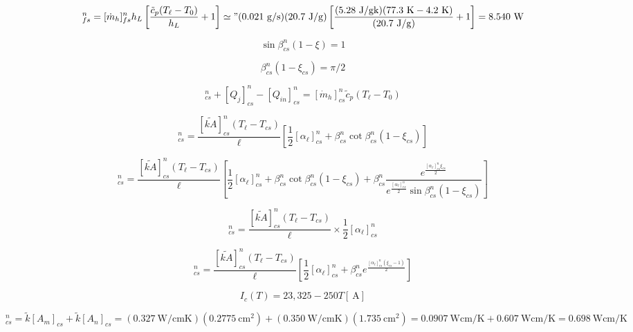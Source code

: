 \begin{equation}
[Q_\ell]_{fs}^{n}=[\dot{m}_h]_{fs}^{n}h_L\left[\frac{\tilde{c}_p(T_\ell-T_0)}{h_L}+1\right] 
\simeq"(0.021\ \mathrm{g/s})(20.7\ \mathrm{J/g})\left[\frac{(5.28\ \mathrm{J/gk})(77.3\ \mathrm{K}-4.2\ \mathrm{K})}{(20.7\ \mathrm{J/g})}+1\right]=8.540\ \mathrm{W}
\end{equation}

\begin{equation}%
\sin\beta_{cs}^{n}(1-\xi)=1
\end{equation}

\begin{equation}%
\beta_{cs}^{n}(1-\xi_{cs})=\pi/2
\end{equation}

\begin{equation}%
[Q_\ell]_{cs}^{n}+[Q_j]_{cs}^{n}-[Q_{in}]_{cs}^{n}=[\dot{m}_h]_{cs}^{n}\tilde{c}_p(T_\ell-T_0)
\end{equation}

\begin{equation}%
[Q_\ell]_{cs}^{n}=\frac{[\tilde{kA}]_{cs}^{n}(T_\ell-T_{cs})}{\ell}[\frac{1}{2}[\alpha_\ell]_{cs}^{n}+\beta_{cs}^{n}\cot\beta_{cs}^{n}(1-\xi_{cs})]
\end{equation}

\begin{equation}%
[Q_j]_{cs}^{n}=\frac{[\tilde{kA}]_{cs}^{n}(T_\ell-T_{cs})}{\ell}\left[\frac{1}{2}[\alpha_\ell]_{cs}^{n}+\beta_{cs}^{n}\cot\beta_{cs}^{n}(1-\xi_{cs}) 
+\beta_{cs}^{n}\frac{e^{\frac{[\alpha_\ell]_{cs}^{n}\xi_{cs}}{2}}}{e^{\frac{[\alpha_\ell]_{cs}^{n}}{2}}\sin\beta_{cs}^{n}(1-\xi_{cs})}\right]
\end{equation}

\begin{equation}%
[Q_\ell]_{cs}^{n}=\frac{[\tilde{kA}]_{cs}^{n}(T_\ell-T_{cs})}{\ell}\times\frac{1}{2}[\alpha_\ell]_{cs}^{n}
\end{equation}

\begin{equation}%
[Q_j]_{cs}^{n}=\frac{[\tilde{kA}]_{cs}^{n}(T_\ell-T_{cs})}{\ell}\left[\frac{1}{2}[\alpha_\ell]_{cs}^{n}+\beta_{cs}^{n}e^{\frac{[\alpha_\ell]_{cs}^{n}(\xi_{cs}-1)}{2}}\right]
\end{equation}

\begin{equation}
 I_c(T)=23,325-250T[\ \mathrm{A}]
\end{equation}

\begin{equation}%
[\tilde{kA}]_{cs}^{n}=\tilde{k}[A_m]_{cs}+\tilde{k}[A_n]_{cs} 
=(0.327\ \mathrm{W/cmK})(0.2775\ \mathrm{cm^2})+(0.350\ \mathrm{W/cmK})(1.735\ \mathrm{cm^2}) 
=0.0907\ \mathrm{W cm/K}+0.607\ \mathrm{W cm/K}=0.698\ \mathrm{W cm/K}
\end{equation}

